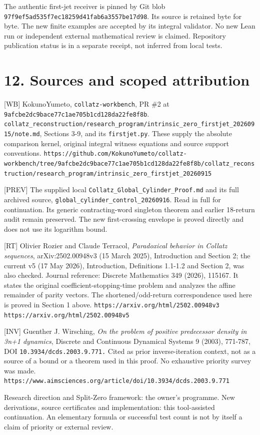 The authentic first-jet receiver is pinned by Git blob
\nolinkurl{97f9ef5ad535f7ec18259d41fab6a3557be17d98}. Its source is
retained byte for byte. The new finite examples are accepted by its
integral validator. No new Lean run or independent external mathematical
review is claimed. Repository publication status is in a separate
receipt, not inferred from local tests.

\section{12. Sources and scoped attribution}

{[}WB{]} KokunoYumeto, \nolinkurl{collatz-workbench}, PR \#2 at
\nolinkurl{9afcbe2dc9bace77c1ae705b1cd128da22fe8f8b}.
\nolinkurl{collatz_reconstruction/research_program/intrinsic_zero_firstjet_20260915/note.md},
Sections 3-9, and its \nolinkurl{firstjet.py}. These supply the absolute
comparison kernel, original integral witness equations and source
support conventions.
\nolinkurl{https://github.com/KokunoYumeto/collatz-workbench/tree/9afcbe2dc9bace77c1ae705b1cd128da22fe8f8b/collatz_reconstruction/research_program/intrinsic_zero_firstjet_20260915}

{[}PREV{]} The supplied local
\nolinkurl{Collatz_Global_Cylinder_Proof.md} and its full archived
source, \nolinkurl{global_cylinder_control_20260916}. Read in full for
continuation. Its generic contracting-word singleton theorem and earlier
18-return audit remain preserved. The new first-crossing envelope is
proved directly and does not use its logarithm bound.

{[}RT{]} Olivier Rozier and Claude Terracol, \emph{Paradoxical behavior
in Collatz sequences}, arXiv:2502.00948v3 (15 March 2025), Introduction
and Section 2; the current v5 (17 May 2026), Introduction, Definitions
1.1-1.2 and Section 2, was also checked. Journal reference: Discrete
Mathematics 349 (2026), 115167. It states the original
coefficient-stopping-time problem and analyzes the affine remainder of
parity vectors. The shortened/odd-return correspondence used here is
proved in Section 1 above.
\nolinkurl{https://arxiv.org/html/2502.00948v3}
\nolinkurl{https://arxiv.org/html/2502.00948v5}

{[}INV{]} Guenther J. Wirsching, \emph{On the problem of positive
predecessor density in 3n+1 dynamics}, Discrete and Continuous Dynamical
Systems 9 (2003), 771-787, DOI \nolinkurl{10.3934/dcds.2003.9.771.}
Cited as prior inverse-iteration context, not as a source of a bound or
a theorem used in this proof. No exhaustive priority survey was made.
\nolinkurl{https://www.aimsciences.org/article/doi/10.3934/dcds.2003.9.771}

Research direction and Split-Zero framework: the owner's programme. New
derivations, source certificates and implementation: this tool-assisted
continuation. An elementary formula or successful test count is not by
itself a claim of priority or external review.
